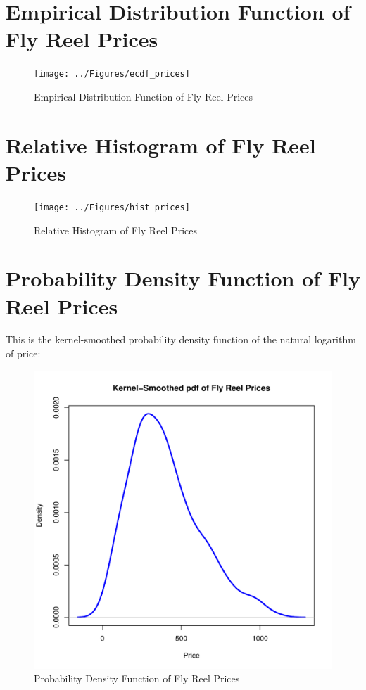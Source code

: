 \documentclass[11pt]{book}
\begin{document}
\section*{Empirical Distribution Function of Fly Reel Prices}

\begin{figure}[h!]
  \centering
  \texttt{[image: ../Figures/ecdf\_prices]}
  \caption{Empirical Distribution Function of Fly Reel Prices} \label{fig:ecdf_prices}
\end{figure}


\section*{Relative Histogram of Fly Reel Prices}

\begin{figure}[h!]
  \centering
  \texttt{[image: ../Figures/hist\_prices]}
  \caption{Relative Histogram of Fly Reel Prices} \label{fig:hist_prices}
\end{figure}


\pagebreak
\section*{Probability Density Function of Fly Reel Prices}

This is the kernel-smoothed probability density function of the natural logarithm of
price:

\begin{figure}[h!]
  \centering
  \includegraphics[scale = 0.5, keepaspectratio=true]{../Figures/density_prices}
  \caption{Probability Density Function of Fly Reel Prices} \label{fig:density_prices}
\end{figure}
\end{document}
